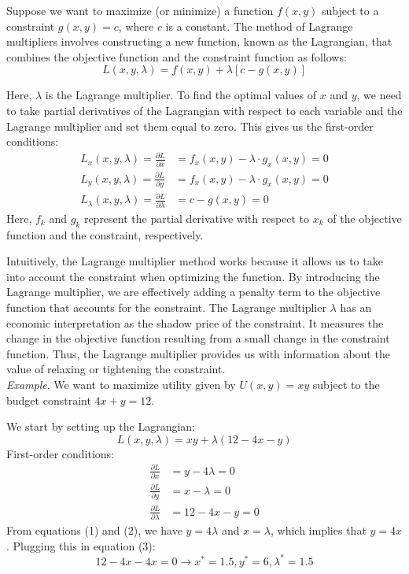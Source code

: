 \documentclass{./../../latex/handout}
\begin{document}
Suppose we want to maximize (or minimize) a function $f(x,y)$ subject to a constraint $g(x,y) = c$, where $c$ is a constant. The method of Lagrange multipliers involves constructing a new function, known as the Lagrangian, that combines the objective function and the constraint function as follows:
\[
L(x,y,\lambda)=f(x, y)+\lambda[c-g(x, y)]
\]

Here, $\lambda$ is the Lagrange multiplier. To find the optimal values of $x$ and $y$, we need to take partial derivatives of the Lagrangian with respect to each variable and the Lagrange multiplier and set them equal to zero. This gives us the first-order conditions:
\begin{align*}
L_x(x,y,\lambda) = \frac{\partial L}{\partial x} &= f_x(x, y)- \lambda \cdot g_x(x, y) = 0 \\
L_y(x,y,\lambda) = \frac{\partial L}{\partial y} &= f_x(x, y)- \lambda \cdot g_x(x, y) = 0 \\
L_{\lambda}(x,y,\lambda) = \frac{\partial L}{\partial \lambda} &= c-g(x, y) = 0 
\end{align*}
Here, $f_k$ and $g_k$ represent the partial derivative with respect to $x_k$ of the objective function and the constraint, respectively. 

Intuitively, the Lagrange multiplier method works because it allows us to take into account the constraint when optimizing the function. By introducing the Lagrange multiplier, we are effectively adding a penalty term to the objective function that accounts for the constraint. The Lagrange multiplier $\lambda$ has an economic interpretation as the shadow price of the constraint. It measures the change in the objective function resulting from a small change in the constraint function. Thus, the Lagrange multiplier provides us with information about the value of relaxing or tightening the constraint.\\


\textit{Example}. We want to maximize utility given by  $U(x,y) = x y$ subject to the budget constraint $4 x + y = 12$. 

We start by setting up the Lagrangian:
\[ L(x, y, \lambda) = x y + \lambda(12-4x-y) \]
First-order conditions:
\begin{align}
\frac{\partial L}{\partial x} &= y- 4 \lambda = 0  \\ 
\frac{\partial L}{\partial y} &= x- \lambda  = 0 \\ 
\frac{\partial L}{\partial \lambda} &= 12-4x-y = 0 
\end{align}
From equations (1) and (2), we have $y=4 \lambda$ and $x=\lambda$, which implies that $y=4x$. Plugging this in equation (3):
\[ 12-4x-4x = 0 \rightarrow x^* = 1.5, y^*=6, \lambda^* = 1.5 \]
\end{document}
